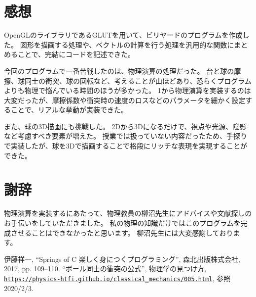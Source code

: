 \documentclass[a4j,titlepage]{jsarticle}
\begin{document}
\section{感想}
OpenGLのライブラリであるGLUTを用いて、ビリヤードのプログラムを作成した。
図形を描画する処理や、ベクトルの計算を行う処理を汎用的な関数にまとめることで、完結にコードを記述できた。

今回のプログラムで一番苦戦したのは、物理演算の処理だった。
台と球の摩擦、球同士の衝突、球の回転など、考えることが山ほどあり、恐らくプログラムよりも物理で悩んでいる時間のほうが多かった。
1から物理演算を実装するのは大変だったが、摩擦係数や衝突時の速度のロスなどのパラメータを細かく設定することで、リアルな挙動が実装できた。

また、球の3D描画にも挑戦した。
2Dから3Dになるだけで、視点や光源、陰影など考慮すべき要素が増えた。
授業では扱っていない内容だったため、手探りで実装したが、球を3Dで描画することで格段にリッチな表現を実現することができた。


\section{謝辞}
物理演算を実装するにあたって、物理教員の柳沼先生にアドバイスや文献探しのお手伝いをしていただきました。
私の物理の知識だけではこのプログラムを完成させることはできなかったと思います。
柳沼先生には大変感謝しております。


\begin{thebibliography}{9}
   伊藤祥一, ``Springs of C 楽しく身につくプログラミング'', 森北出版株式会社, 2017, pp. 109--110.
   ``ボール同士の衝突の公式'', 物理学の見つけ方, \texttt{\url{https://physics-htfi.github.io/classical_mechanics/005.html}}, 参照2020/2/3.
\end{thebibliography}
\end{document}
